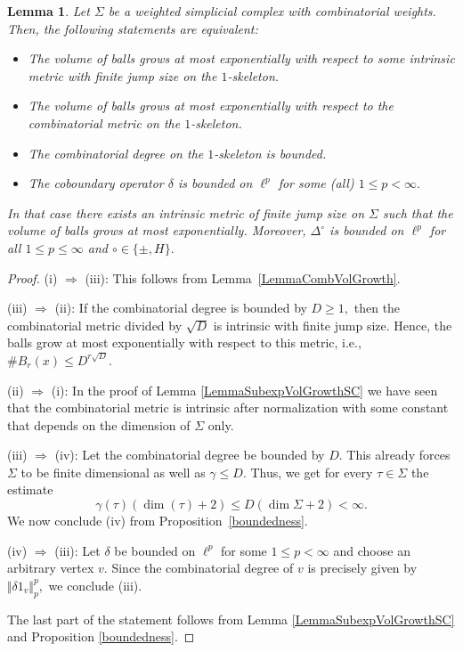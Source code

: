 \documentclass[10pt]{amsart}
\newtheorem{lemma}[theorem]{Lemma}
\theoremstyle{definition}
\begin{document}
\begin{lemma}\label{LemmaVolGrowthSC}
    Let $\Sigma$ be a weighted simplicial complex with combinatorial weights. Then, the following statements are equivalent:
    \begin{itemize}
        \item[(i)] The volume of balls grows at most exponentially with respect to some intrinsic metric with finite jump size on the $1$-skeleton.
        \item[(ii)]   The volume of balls grows at most exponentially with respect to the combinatorial metric on the $1$-skeleton.
        \item[(iii)] The combinatorial degree on the  $1$-skeleton is bounded.
        \item[(iv)] The coboundary operator $\delta$ is bounded on $\ell^p$ for some (all) $1\leq p< \infty.$
    \end{itemize}
    In that case there exists an intrinsic metric of finite jump size on $\Sigma$ such that the volume of balls grows at most exponentially.   Moreover, $\Delta^\circ$ is bounded on $\ell^p$ for all $1\leq p\leq\infty$ and $\circ\in\lbrace\pm,H\rbrace.$
\end{lemma}
\begin{proof}
(i) $\Rightarrow$ (iii): This follows from Lemma~\ref{LemmaCombVolGrowth}.

(iii) $\Rightarrow$ (ii):  If the combinatorial degree is bounded by $D\ge 1,$ then the combinatorial metric divided by $\sqrt{D}$ is intrinsic with finite jump size. Hence, the balls grow at most exponentially with respect to this metric, i.e., $\#B_r(x)\leq D^{r\sqrt{D}}$.


(ii) $\Rightarrow$ (i): In the proof of Lemma \ref{LemmaSubexpVolGrowthSC} we have seen that the combinatorial metric is intrinsic after normalization with some constant that depends on the dimension of $\Sigma$ only.



(iii) $\Rightarrow$ (iv):
Let the combinatorial degree be bounded by $D.$ This already forces $\Sigma$ to be finite dimensional as well as $\gamma\leq D.$ Thus, we get for every $\tau\in\Sigma$ the estimate \[\gamma(\tau)(\dim(\tau)+2)\leq D(\dim\Sigma+2)<\infty.\] We now conclude (iv) from Proposition~\ref{boundedness}.

(iv) $\Rightarrow$ (iii): Let $\delta$ be bounded on $\ell^p$ for some $1\leq p<\infty$ and choose an arbitrary vertex $v.$ Since the combinatorial degree of $v$ is precisely given by $\Vert \delta 1_v\Vert_p^p,$ we conclude (iii). 

The last part of the statement follows from Lemma \ref{LemmaSubexpVolGrowthSC} and Proposition \ref{boundedness}.
\end{proof}
\end{document}
